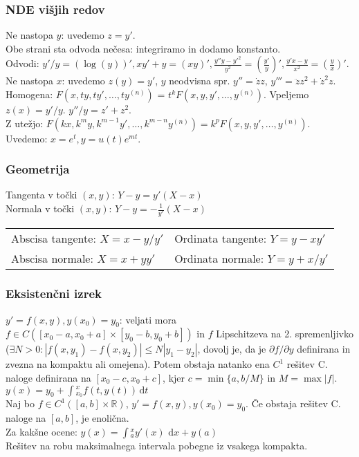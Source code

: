 \documentclass[a4paper,10pt]{article}
\theoremstyle{definition}
\def\R{\mathbb{R}}
\newcommand{\dx}{\ensuremath{\,\mathrm{d}x}}
\newcommand{\dt}{\ensuremath{\,\mathrm{d}t}}
\let\oldint\int
\renewcommand{\int}{\oldint \!}
\begin{document}
\subsubsection*{NDE višjih redov}
Ne nastopa $y$: uvedemo $z = y'$. \\
Obe strani sta odvoda nečesa: integriramo in dodamo konstanto. \\
\hspace*{20pt} Odvodi: $y'/y = (\log(y))', x y' + y = (xy)', \frac{y'' y - y'^2}{y^2} = (\frac{y'}{y})', \frac{y' x - y}{x^2} = (\frac{y}{x})'$.\\
Ne nastopa $x$: uvedemo $z(y) = y'$, $y$ neodvisna spr. $y'' = \dot{z}z$, $y''' =
  \ddot{z}z^2 + \dot{z}^2z$. \\
Homogena: $F(x, ty, ty', \dots, ty^{(n)})$ = $t^k F(x, y, y', \dots,  y^{(n)})$. Vpeljemo $z(x) = y'/y$. $y''/y = z' + z^2$.\\
Z utežjo: $F(kx, k^my, k^{m-1}y', \dots, k^{m-n}y^{(n)}) = k^pF(x, y, y', \dots,  y^{(n)})$. Uvedemo: $x = e^t, y = u(t)e^{mt}$.

\subsubsection*{Geometrija}
Tangenta v točki $(x,y)$: $Y-y=y'(X-x)$ \\
Normala v točki $(x,y)$: $Y-y=-\frac{1}{y'}(X-x)$

\begin{tabular}{ll}
Abscisa tangente: $X = x - y/y'$ & Ordinata tangente: $Y = y - xy'$ \\
Abscisa normale: $X = x+yy'$ & Ordinata normale: $Y = y + x/y'$
\end{tabular}

\subsubsection*{Eksistenčni izrek}
$y' = f(x, y), y(x_0) = y_0$: veljati mora $f \in C([x_0 - a, x_0 + a] \times
[y_0 - b, y_0 + b])$ in $f$ Lipschitzeva na 2. spremenljivko ($\exists N>0:
|f(x, y_1) - f(x, y_2)| \leq N |y_1 - y_2|$, dovolj je, da je $\partial
f/\partial y$ definirana in zvezna na kompaktu ali omejena). Potem obstaja
natanko ena $C^1$ rešitev C. naloge definirana na $[x_0 - c, x_0 + c]$,
kjer $c = \min\{a, b/M\}$ in $M = \max|f|$.\\
\hspace*{20pt}$y(x) = y_0 + \int_{x_0}^x f(t, y(t)) \dt$\\
Naj bo $f \in C^1([a, b] \times\R)$, $y' = f(x, y), y(x_0) = y_0$. Če obstaja rešitev C. naloge na $[a, b]$, je enolična.\\
Za kakšne ocene: $y(x) = \int_a^x y'(x) \, \dx + y(a)$\\
Rešitev na robu maksimalnega intervala pobegne iz vsakega kompakta.\\
\end{document}
